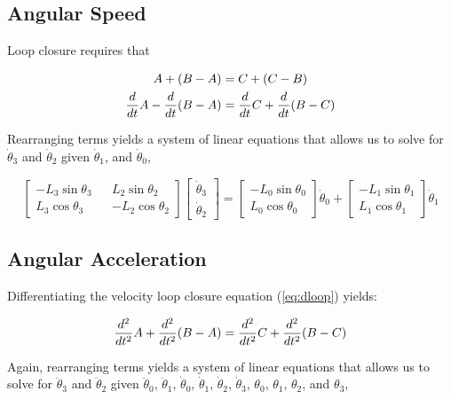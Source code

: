 \documentclass[letterpaper]{article}
\begin{document}
\subsection{Angular Speed}

Loop closure requires that

\begin{align}
	A + (B - A) &= C + (C - B) \notag \\
	\frac{d}{dt} A - \frac{d}{dt} (B - A) &= \frac{d}{dt} C + \frac{d}{dt} (B - C) \label{eq:dloop}\\
\end{align}

\noindent Rearranging terms yields a system of linear equations that allows us to solve for $\dot{\theta}_3$ and $\dot{\theta}_2$ given $\dot{\theta}_1$, and $\dot{\theta}_0$,

\begin{equation}
	\begin{bmatrix} -L_3 \sin \theta_3 && L_2 \sin \theta_2 \\ L_3 \cos \theta_3 && - L_2 \cos \theta_2 \end{bmatrix} \begin{bmatrix} \dot{\theta}_3 \\ \dot{\theta}_2 \end{bmatrix} = \begin{bmatrix} -L_0 \sin \theta_0 \\ L_0 \cos \theta_0 \end{bmatrix} \dot{\theta}_0 + \begin{bmatrix} -L_1 \sin \theta_1 \\ L_1 \cos \theta_1 \end{bmatrix} \dot{\theta}_1
\end{equation}

\subsection{Angular Acceleration}

Differentiating the velocity loop closure equation (\ref{eq:dloop}) yields:

\begin{equation}
	\frac{d^2}{dt^2} A + \frac{d^2}{dt^2} (B -A) = \frac{d^2}{dt^2} C + \frac{d^2}{dt^2} (B - C) \\
\end{equation}

\noindent Again, rearranging terms yields a system of linear equations that allows us to solve for $\ddot{\theta}_3$ and $\ddot{\theta}_2$ given $\ddot{\theta}_0$, $\ddot{\theta}_1$, $\dot{\theta}_0$, $\dot{\theta}_1$, $\dot{\theta}_2$, $\dot{\theta}_3$, $\theta_0$, $\theta_1$, $\theta_2$, and $\theta_3$,
\end{document}
